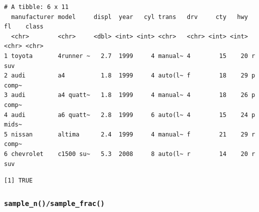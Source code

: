 \documentclass[
  11pt,
]{krantz}
\newenvironment{Shaded}{\begin{snugshade}}{\end{snugshade}}
\newcommand{\CommentTok}[1]{\textcolor[rgb]{0.37,0.37,0.37}{\textit{#1}}}
\newcommand{\DataTypeTok}[1]{\textcolor[rgb]{0.27,0.27,0.27}{#1}}
\newcommand{\DecValTok}[1]{\textcolor[rgb]{0.06,0.06,0.06}{#1}}
\newcommand{\KeywordTok}[1]{\textcolor[rgb]{0.27,0.27,0.27}{\textbf{#1}}}
\newcommand{\NormalTok}[1]{#1}
\newcommand{\OperatorTok}[1]{\textcolor[rgb]{0.43,0.43,0.43}{\textbf{#1}}}
\newcommand{\OtherTok}[1]{\textcolor[rgb]{0.37,0.37,0.37}{#1}}
\newcommand{\StringTok}[1]{\textcolor[rgb]{0.5,0.5,0.5}{#1}}
\begin{document}
\begin{Shaded}
\end{Shaded}

\begin{verbatim}
# A tibble: 6 x 11
  manufacturer model     displ  year   cyl trans   drv     cty   hwy fl    class
  <chr>        <chr>     <dbl> <int> <int> <chr>   <chr> <int> <int> <chr> <chr>
1 toyota       4runner ~   2.7  1999     4 manual~ 4        15    20 r     suv  
2 audi         a4          1.8  1999     4 auto(l~ f        18    29 p     comp~
3 audi         a4 quatt~   1.8  1999     4 manual~ 4        18    26 p     comp~
4 audi         a6 quatt~   2.8  1999     6 auto(l~ 4        15    24 p     mids~
5 nissan       altima      2.4  1999     4 manual~ f        21    29 r     comp~
6 chevrolet    c1500 su~   5.3  2008     8 auto(l~ r        14    20 r     suv  
\end{verbatim}

\begin{Shaded}
\end{Shaded}

\begin{verbatim}
[1] TRUE
\end{verbatim}

\normalsize

\hypertarget{dplyr-sample}{%
\subsubsection*{\texorpdfstring{\texttt{sample\_n()/sample\_frac()}}{sample\_n()/sample\_frac()}}\label{dplyr-sample}}
\end{document}
